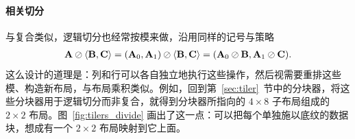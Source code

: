 \paragraph{相关切分}

与复合类似，逻辑切分也经常按模来做，沿用同样的记号与策略
\begin{align*}
\mathbf{A} \oslash \langle \mathbf{B},\mathbf{C} \rangle = (\mathbf{A}_0,\mathbf{A}_1) \oslash \langle \mathbf{B},\mathbf{C} \rangle = (\mathbf{A}_0 \oslash \mathbf{B}, \mathbf{A}_1 \oslash \mathbf{C}).
\end{align*}
这么设计的道理是：列和行可以各自独立地执行这些操作，然后视需要重排这些模、构造新布局，与布局乘积类似。例如，回到第~\ref{sec:tiler}~节中的分块器，将这些分块器用于逻辑切分而非复合，就得到分块器所指向的 $4 {\times} 8$ 子布局组成的 $2 {\times} 2$ 布局。图~\ref{fig:tilers_divide} 画出了这一点：可以把每个单独施以底纹的数据块，想成有一个 $2 {\times} 2$ 布局映射到它上面。

